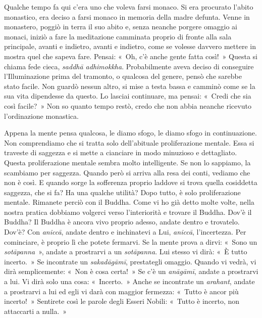 Qualche tempo fa qui c'era uno che voleva farsi monaco. Si era procurato
l'abito monastico, era deciso a farsi monaco in memoria della madre
defunta. Venne in monastero, poggiò in terra il suo abito e, senza
neanche porgere omaggio ai monaci, iniziò a fare la meditazione
camminata proprio di fronte alla sala principale, avanti e indietro,
avanti e indietro, come se volesse davvero mettere in mostra quel che
sapeva fare. Pensai: «~Oh, c'è anche gente fatta così!~» Questa si
chiama fede cieca, \emph{saddhā adhimokkha}. Probabilmente aveva deciso
di conseguire l'Illuminazione prima del tramonto, o qualcosa del genere,
pensò che sarebbe stato facile. Non guardò nessun altro, si mise a testa
bassa e camminò come se la sua vita dipendesse da questo. Lo lasciai
continuare, ma pensai: «~Credi che sia così facile?~» Non so quanto
tempo restò, credo che non abbia neanche ricevuto l'ordinazione
monastica.

Appena la mente pensa qualcosa, le diamo sfogo, le diamo sfogo in
continuazione. Non comprendiamo che si tratta solo dell'abituale
proliferazione mentale. Essa si traveste di saggezza e si mette a
cianciare in modo minuzioso e dettagliato. Questa proliferazione mentale
sembra molto intelligente. Se non lo sappiamo, la scambiamo per
saggezza. Quando però si arriva alla resa dei conti, vediamo che non è
così. E quando sorge la sofferenza proprio laddove si trova quella
cosiddetta saggezza, che si fa? Ha una qualche utilità? Dopo tutto, è
solo proliferazione mentale. Rimanete perciò con il Buddha. Come vi ho
già detto molte volte, nella nostra pratica dobbiamo volgerci verso
l'interiorità e trovare il Buddha. Dov'è il Buddha? Il Buddha è ancora
vivo proprio adesso, andate dentro e trovatelo. Dov'è? Con
\emph{aniccā}, andate dentro e inchinatevi a Lui, \emph{aniccā},
l'incertezza. Per cominciare, è proprio lì che potete fermarvi. Se la
mente prova a dirvi: «~Sono un \emph{sotāpanna}~», andate a prostrarvi a
un \emph{sotāpanna}. Lui stesso vi dirà: «~È tutto incerto.~» Se
incontrate un \emph{sakadāgāmī}, prestategli omaggio. Quando vi vedrà,
vi dirà semplicemente: «~Non è cosa certa!~» Se c'è un \emph{anāgāmī},
andate a prostrarvi a lui. Vi dirà solo una cosa: «~Incerto.~» Anche se
incontrate un \emph{arahant}, andate a prostrarvi a lui ed egli vi darà
con maggior fermezza: «~Tutto è ancor più incerto!~» Sentirete così le
parole degli Esseri Nobili: «~Tutto è incerto, non attaccarti a nulla.~»

